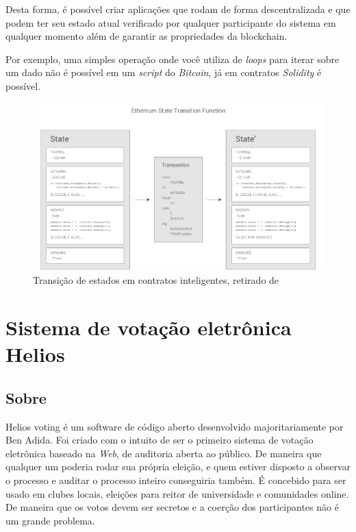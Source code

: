 \documentclass{ufsctex/ufsctex}
\begin{document}
Desta forma, é possível criar aplicações que rodam de forma descentralizada e
que podem ter seu estado atual verificado por qualquer participante do sistema
em qualquer momento além de garantir as propriedades da blockchain.

Por exemplo, uma simples operação onde você utiliza de \textit{loops} para
iterar sobre um dado não é possível em um \textit{script} do \textit{Bitcoin},
já em contratos \textit{Solidity} é possível.

\begin{figure}[htb]
	\centering
	\includegraphics[scale=0.6]{ethereum}
	\caption{Transição de estados em contratos inteligentes, retirado de \cite{ethereum}}
	\label{fig:ethereum}
\end{figure}
\chapter{Sistema de votação eletrônica Helios}

\section{Sobre}

Helios voting é um software de código aberto desenvolvido majoritariamente por
Ben Adida\cite{benAdida}. Foi criado com o intuito de ser o primeiro sistema de
votação eletrônica baseado na \textit{Web}, de auditoria aberta ao público. De
maneira que qualquer um poderia rodar sua própria eleição, e quem estiver
disposto a observar o processo e auditar o processo inteiro conseguiria também.
É concebido para ser usado em clubes locais, eleições para reitor de
universidade e comunidades online. De maneira que os  votos devem ser secretos
e a coerção dos participantes não é um grande problema. \cite{benAdida}
\end{document}
